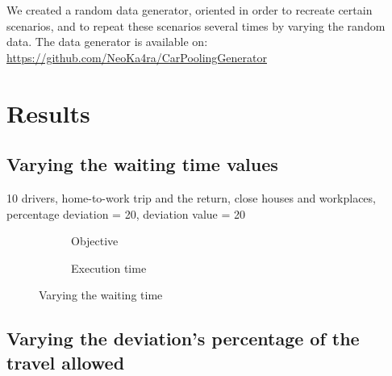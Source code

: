 \documentclass[12pt, a4paper,twoside]{memoir}
\begin{document}
	We created a random data generator, oriented in order to recreate certain scenarios, and to repeat these scenarios several times by varying the random data.
	The data generator is available on: \url{https://github.com/NeoKa4ra/CarPoolingGenerator}
	
	\section{Results}
	\subsection{Varying the waiting time values}
	10 drivers, home-to-work trip and the return, close houses and workplaces, percentage deviation = 20, deviation value = 20
	\begin{figure}[H]
		\centering
		\begin{subfigure}{.5\textwidth}
			\centering
			\caption{Objective}
		\end{subfigure}%
		\begin{subfigure}{.5\textwidth}
			\centering
			\caption{Execution time}
		\end{subfigure}
		\caption{Varying the waiting time}
		\label{fig:var wt}
	\end{figure}
	
	\subsection{Varying the deviation's percentage of the travel allowed}
	
\end{document}
